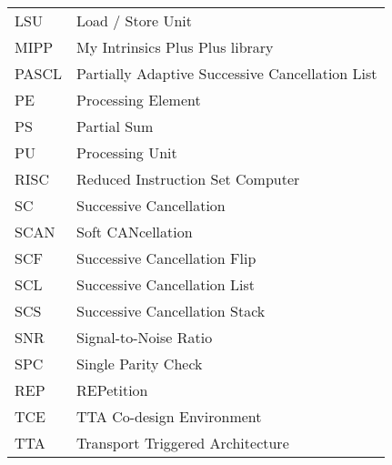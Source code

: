 \begin{center}
\begin{longtable}{ p{}  p{} }
LSU       & Load / Store Unit                                      \\
MIPP      & My Intrinsics Plus Plus library                        \\
PASCL     & Partially Adaptive Successive Cancellation List        \\
PE        & Processing Element                                     \\
PS        & Partial Sum                                            \\
PU        & Processing Unit                                        \\
RISC      & Reduced Instruction Set Computer                       \\
SC        & Successive Cancellation                                \\
SCAN      & Soft CANcellation                                      \\
SCF       & Successive Cancellation Flip                           \\
SCL       & Successive Cancellation List                           \\
SCS       & Successive Cancellation Stack                          \\
SNR       & Signal-to-Noise Ratio                                  \\
SPC       & Single Parity Check                                    \\
REP       & REPetition                                             \\
TCE       & TTA Co-design Environment                              \\
TTA       & Transport Triggered Architecture                       \\
\end{longtable}

\end{center}

